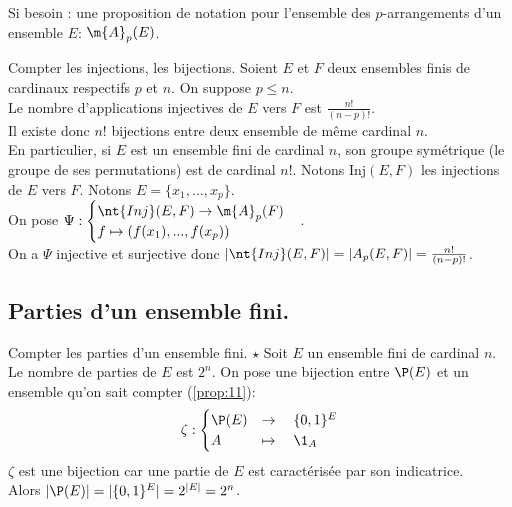 \documentclass[11pt]{article}
\begin{document}
Si besoin : une proposition de notation pour l'ensemble des $p$-arrangements d'un ensemble $E$: $\m{A}_p(E)$.

\begin{corr}{Compter les injections, les bijections.}{}
    Soient $E$ et $F$ deux ensembles finis de cardinaux respectifs $p$ et $n$. On suppose $p\leq n$.\\
    Le nombre d'applications injectives de $E$ vers $F$ est $\frac{n!}{(n-p)!}$.\\
    Il existe donc $n!$ bijections entre deux ensemble de même cardinal $n$.\\
    En particulier, si $E$ est un ensemble fini de cardinal $n$, son groupe symétrique (le groupe de ses permutations) est de cardinal $n!$.
    \tcblower
    Notons Inj$(E,F)$ les injections de $E$ vers $F$. Notons $E=\{x_1,...,x_p\}$.\\
    On pose $\Psi:\begin{cases}
        \nt{Inj}(E,F)\to\m{A}_p(F)\\
        f\mapsto (f(x_1),...,f(x_p))
    \end{cases}$.\\
    On a $\Psi$ injective et surjective donc $|\nt{Inj}(E,F)|=|A_p(E,F)|=\frac{n!}{(n-p)!}$.
\end{corr}



\subsection{Parties d'un ensemble fini.}

\begin{prop}{Compter les parties d'un ensemble fini. $\star$}{}
    Soit $E$ un ensemble fini de cardinal $n$.\\
    Le nombre de parties de $E$ est $2^n$.
    \tcblower
    On pose une bijection entre $\P(E)$ et un ensemble qu'on sait compter (\ref{prop:11}):
    \begin{equation*}
        \zeta:\begin{cases}
            \P(E)&\to\quad \{0,1\}^E\\
            A&\mapsto\quad\1_A
        \end{cases}
    \end{equation*}
    $\zeta$ est une bijection car une partie de $E$ est caractérisée par son indicatrice.\\
    Alors $|\P(E)|=|\{0,1\}^E|=2^{|E|}=2^n$.
\end{prop}
\end{document}
